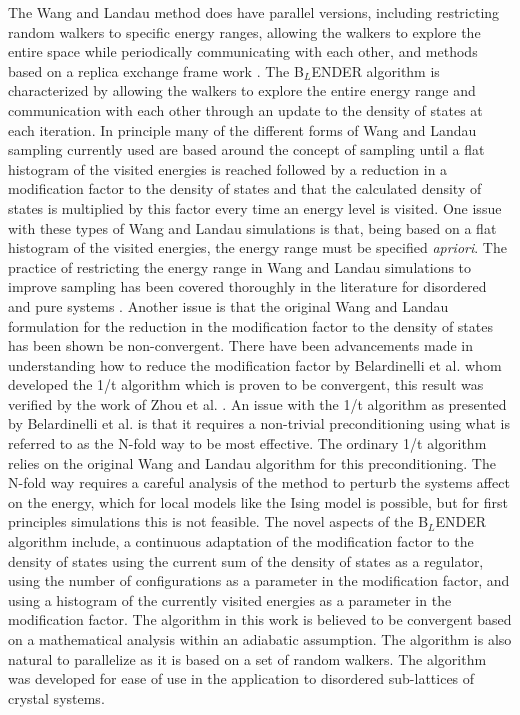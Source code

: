 \documentclass[aps,pre,reprint,superscriptaddress,showkeys]{revtex4-2}
\begin{document}
    The Wang and Landau method does have parallel versions, including  restricting random walkers to specific energy ranges, allowing the walkers to explore the entire space while periodically communicating with each other, and methods based on a replica exchange frame work \cite{MP_Wang_Landau,P_imp_Wang_Landau, Hframe_Wang_Landau, Scalable_replica_exchange}.  The B$_{L}$ENDER algorithm is characterized by allowing the walkers to explore the entire energy range and communication with each other through an update to the density of states at each iteration.  In principle many of the different forms of  Wang and Landau sampling currently used are based around the concept of sampling until a flat histogram of the visited energies is reached followed by a reduction in a modification factor to the density of states and that the calculated density of states  is multiplied by this factor every time an energy level  is visited.  One issue with these types of Wang and Landau simulations is that, being based on a flat histogram of the visited energies, the energy range must be specified \textit{apriori}. The practice of restricting the energy range in Wang and Landau simulations to improve sampling has been covered thoroughly in the literature for disordered and pure systems \cite{criticalbehavior,domensubspaces,specificheat3dising,criticalbehavior2dising,dominantenergysubspace3ising,QuenchedBond2dising}. Another issue is that the original Wang and Landau formulation for the reduction in the modification factor to the  density of states has been shown be non-convergent\cite{Non_convergent_WL,Non_convergent_WL_2,non_convergence_multiple_random_walkers,Optimal_modification}.   There have been advancements made in understanding how to reduce the modification factor by Belardinelli et al. \cite{saturation} whom developed the 1/t algorithm which is proven to be convergent, this result was verified by the work of Zhou et al. \cite{Optimal_modification}. An issue with the 1/t algorithm as presented by Belardinelli et al. is that it requires a non-trivial preconditioning using what is referred to as the N-fold way to be most effective. The ordinary 1/t algorithm relies on the original Wang and Landau algorithm for this preconditioning. The N-fold way requires a careful analysis of the  method to perturb the systems affect on the energy, which for local models like the Ising model is possible, but for first principles simulations this is not feasible. The novel aspects of the B$_{L}$ENDER algorithm include, a continuous adaptation of the modification factor to the  density of states using the current sum of the density of states as a regulator, using the number of configurations as a parameter in the modification factor, and using a histogram of the currently visited energies as a parameter in the modification factor.  The algorithm in this work is believed to be convergent based on a mathematical analysis within an adiabatic assumption. The algorithm is also natural to parallelize as it is based on a set of random walkers. The algorithm was developed for ease of use in the application to disordered sub-lattices of crystal systems. 
\end{document}
